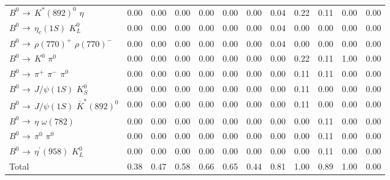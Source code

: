 {\begin{tabular}{lrrrrrrrrrrr}
$B^{0}$ $\rightarrow$ $K^{*}(892)^{0}$ $\eta$                   &         0.00 &         0.00 &         0.00 &         0.00 &         0.00 &         0.00 &         0.04 &         0.22 &         0.11 &         0.00 &         0.00 \\
$B^{0}$ $\rightarrow$ $\eta_{c}(1S)$ $K_{L}^{0}$                &         0.00 &         0.00 &         0.00 &         0.00 &         0.00 &         0.00 &         0.04 &         0.00 &         0.00 &         0.00 &         0.00 \\
$B^{0}$ $\rightarrow$ $\rho(770)^{+}$ $\rho(770)^{-}$           &         0.00 &         0.00 &         0.00 &         0.00 &         0.00 &         0.00 &         0.04 &         0.00 &         0.00 &         0.00 &         0.00 \\
$B^{0}$ $\rightarrow$ $K^{0}$ $\pi^{0}$                         &         0.00 &         0.00 &         0.00 &         0.00 &         0.00 &         0.00 &         0.00 &         0.22 &         0.11 &         1.00 &         0.00 \\
$B^{0}$ $\rightarrow$ $\pi^{+}$ $\pi^{-}$ $\pi^{0}$             &         0.00 &         0.00 &         0.00 &         0.00 &         0.00 &         0.00 &         0.00 &         0.11 &         0.11 &         0.00 &         0.00 \\
$B^{0}$ $\rightarrow$ $J/\psi(1S)$ $K_{S}^{0}$                  &         0.00 &         0.00 &         0.00 &         0.00 &         0.00 &         0.00 &         0.00 &         0.11 &         0.00 &         0.00 &         0.00 \\
$B^{0}$ $\rightarrow$ $J/\psi(1S)$ $\overline{K}^{*}(892)^{0}$  &         0.00 &         0.00 &         0.00 &         0.00 &         0.00 &         0.00 &         0.00 &         0.11 &         0.00 &         0.00 &         0.00 \\
$B^{0}$ $\rightarrow$ $\eta$ $\omega(782)$                      &         0.00 &         0.00 &         0.00 &         0.00 &         0.00 &         0.00 &         0.00 &         0.00 &         0.11 &         0.00 &         0.00 \\
$B^{0}$ $\rightarrow$ $\pi^{0}$ $\pi^{0}$                       &         0.00 &         0.00 &         0.00 &         0.00 &         0.00 &         0.00 &         0.00 &         0.00 &         0.11 &         0.00 &         0.00 \\
$B^{0}$ $\rightarrow$ $\eta^{\prime}(958)$ $K_{L}^{0}$          &         0.00 &         0.00 &         0.00 &         0.00 &         0.00 &         0.00 &         0.00 &         0.00 &         0.11 &         0.00 &         0.00 \\
\hline
Total                                                   &         0.38 &         0.47 &         0.58 &         0.66 &         0.65 &         0.44 &         0.81 &         1.00 &         0.89 &         1.00 &         0.00 \\
\hline
\end{tabular}
}